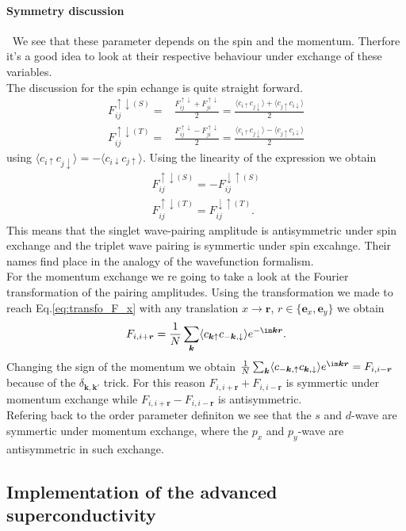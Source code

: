 \documentclass[../main.tex]{subfile}
\begin{document}
\paragraph{Symmetry discussion} $~$ We see that these parameter depends on the spin and the momentum. Therfore it's a good idea to look at their respective
behaviour under exchange of these variables.\\

The discussion for the spin echange is quite straight forward.
\begin{align*}
    F_{ij}^{\uparrow\downarrow(S)} =& \frac{F_{ij}^{\uparrow\downarrow} + F_{ji}^{\uparrow\downarrow}}{2} = \frac{\langle c_{i\uparrow}c_{j\downarrow}\rangle + \langle c_{j\uparrow}c_{i\downarrow}\rangle}{2}\\
    F_{ij}^{\uparrow\downarrow(T)} =& \frac{F_{ij}^{\uparrow\downarrow} - F_{ji}^{\uparrow\downarrow}}{2} = \frac{\langle c_{i\uparrow}c_{j\downarrow}\rangle - \langle c_{j\uparrow}c_{i\downarrow}\rangle}{2}
\end{align*}
 using $\langle c_{i\uparrow}c_{j\downarrow}\rangle = -\langle c_{i\downarrow}c_{j\uparrow}\rangle$. Using the linearity of the expression we obtain
\begin{align*}
    F_{ij}^{\uparrow\downarrow(S)} = - F_{ij}^{\downarrow\uparrow(S)}\\
    F_{ij}^{\uparrow\downarrow(T)} = F_{ij}^{\downarrow\uparrow(T)}.
\end{align*}
This means that the singlet wave-pairing amplitude is antisymmetric under spin exchange and the triplet wave pairing is symmertic under spin excahnge. Their names
find place in the analogy of the wavefunction formalism.\\

For the momentum exchange we re going to take a look at the Fourier transformation of the pairing amplitudes. Using the transformation we made to 
reach Eq.\ref{eq:transfo_F_x} with any translation $ x \rightarrow \bm{r}$, $r\in \{\bm{e}_x,\bm{e}_y\}$ we obtain
\begin{align*}
    F_{i,i+ \bm{r}} = \frac{1}{N} \sum_{\bm{k}} \langle c_{\bm{k}\uparrow} c_{-\bm{k},\downarrow}\rangle e^{-\im\bm{k}\bm{r}}.
\end{align*}
Changing the sign of the momentum we obtain  $\frac{1}{N} \sum_{\bm{k}} \langle c_{-\bm{k},\uparrow} c_{\bm{k},\downarrow}\rangle e^{\im\bm{k}\bm{r}} =  F_{i,i- \bm{r}}$
because of the $\delta_{\bm{k},\bm{k}'}$ trick. For this reason $F_{i,i+ \bm{r}} +  F_{i,i- \bm{r}}$ is symmertic under momentum exchange while $F_{i,i+ \bm{r}} -  F_{i,i- \bm{r}}$ is antisymmetric.\\
Refering back to the order parameter definiton we see that the $s$ and $d$-wave are symmertic under momentum exchange, where the $p_x$ and $p_y$-wave are antisymmetric in such exchange.\\

\subsection{Implementation of the advanced superconductivity}

\end{document}
